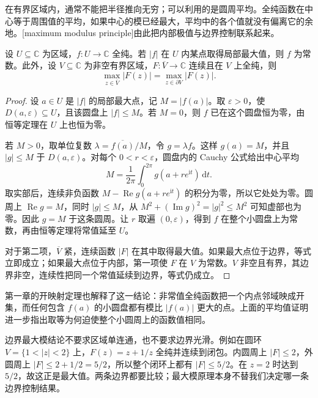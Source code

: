 在有界区域内，通常不能把半径推向无穷；可以利用的是圆周平均。全纯函数在中心等于周围值的平均，如果中心的模已经最大，平均中的各个值就没有偏离它的余地。[maximum modulus principle]由此把内部极值与边界控制联系起来。

\begin{theorem}[最大模原理]\label{b3:thm:02-maximum-modulus}
设 \(U\subseteq\mathbb C\) 为区域，\(f:U\to\mathbb C\) 全纯。若 \(|f|\) 在 \(U\) 内某点取得局部最大值，则 \(f\) 为常数。此外，设 \(V\subseteq\mathbb C\) 为非空有界区域，\(F:\overline V\to\mathbb C\) 连续且在 \(V\) 上全纯，则
\[
 \max_{z\in\overline V}|F(z)|
 =\max_{z\in\partial V}|F(z)|.
\]
\end{theorem}
\begin{proof}
设 \(a\in U\) 是 \(|f|\) 的局部最大点，记 \(M=|f(a)|\)。取 \(\varepsilon>0\)，使 \(D(a,\varepsilon)\subseteq U\)，且该圆盘上 \(|f|\le M\)。若 \(M=0\)，则 \(f\) 已在这个圆盘恒为零，由恒等定理在 \(U\) 上也恒为零。

若 \(M>0\)，取单位复数 \(\lambda=\overline{f(a)}/M\)，令 \(g=\lambda f\)。这样 \(g(a)=M\)，并且 \(|g|\le M\) 于 \(D(a,\varepsilon)\)。对每个 \(0<r<\varepsilon\)，圆盘内的 Cauchy 公式给出中心平均
\[
 M=\frac1{2\pi}\int_0^{2\pi}g(a+re^{\mathrm{i}t})\,\mathrm{d}t.
\]
取实部后，连续非负函数 \(M-\operatorname{Re}g(a+re^{\mathrm{i}t})\) 的积分为零，所以它处处为零。圆周上 \(\operatorname{Re}g=M\)，同时 \(|g|\le M\)，从
\(M^2+(\operatorname{Im}g)^2=|g|^2\le M^2\)
可知虚部也为零。因此 \(g=M\) 于这条圆周。让 \(r\) 取遍 \((0,\varepsilon)\)，得到 \(f\) 在整个小圆盘上为常数，再由恒等定理将常值延至 \(U\)。

对于第二项，\(\overline V\) 紧，连续函数 \(|F|\) 在其中取得最大值。如果最大点位于边界，等式立即成立；如果最大点位于内部，第一项使 \(F\) 在 \(V\) 为常数。\(V\) 非空且有界，其边界非空，连续性把同一个常值延续到边界，等式仍成立。
\end{proof}

第一章的开映射定理也解释了这一结论：非常值全纯函数把一个内点邻域映成开集，而任何包含 \(f(a)\) 的小圆盘都有模比 \(|f(a)|\) 更大的点。上面的平均值证明进一步指出取等为何迫使整个小圆周上的函数值相同。

\ProseParagraphBreak

边界最大模结论不要求区域单连通，也不要求边界光滑。例如在圆环 \(V=\{1<|z|<2\}\) 上，\(F(z)=z+1/z\) 全纯并连续到闭包。内圆周上 \(|F|\le2\)，外圆周上 \(|F|\le2+1/2=5/2\)，所以整个闭环上都有 \(|F|\le5/2\)。在 \(z=2\) 时达到 \(5/2\)，故这正是最大值。两条边界都要比较；最大模原理本身不替我们决定哪一条边界控制结果。

